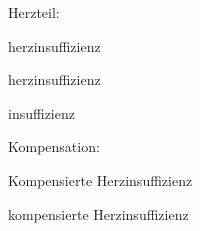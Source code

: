 {}{
\begin{compactitem}
  \item Herzteil:
  \begin{compactitem}
    \item {}herzinsuffizienz
    \item {}herzinsuffizienz
    \item {}insuffizienz
  \end{compactitem}
  \item Kompensation:
  \begin{compactitem}
    \item Kompensierte Herzinsuffizienz
    \item {}kompensierte Herzinsuffizienz
  \end{compactitem}
\end{compactitem}
}{}{}{}










